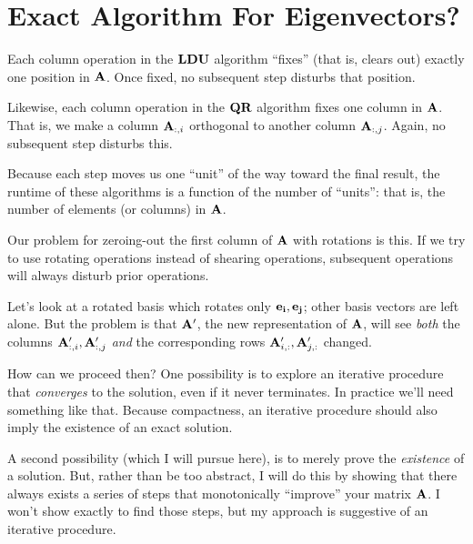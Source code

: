 \section{Exact Algorithm For Eigenvectors?}

Each column operation in the $\mathbf{L}\mathbf{D}\mathbf{U}$ algorithm ``fixes'' (that is,
clears out) exactly one position in $\mathbf{A}$. Once fixed, no subsequent
step disturbs that position.

Likewise, each column operation in the $\mathbf{Q}\mathbf{R}$ algorithm fixes one
column in $\mathbf{A}$. That is, we make a column $\mathbf{A}_{:, i}$ orthogonal
to another column $\mathbf{A}_{:, j}$. Again, no subsequent step disturbs
this.

Because each step moves us one ``unit'' of the way toward the final
result, the runtime of these algorithms is a function of the number of
``units'': that is, the number of elements (or columns) in $\mathbf{A}$.

Our problem for zeroing-out the first column of $\mathbf{A}$ with rotations
is this. If we try to use rotating operations instead of shearing
operations, subsequent operations will always disturb prior operations.

Let's look at a rotated basis which rotates only $\mathbf{e}_{\mathbf{i}}, \mathbf{e}_{\mathbf{j}}$;
other basis vectors are left alone. But the problem is that $\mathbf{A}'$,
the new representation of $\mathbf{A}$, will see
\emph{both} the columns $\mathbf{A}'_{:, i}, \mathbf{A}'_{:, j}$ \emph{and}
the corresponding rows $\mathbf{A}'_{i, :}, \mathbf{A}'_{j, :}$ changed.

How can we proceed then? One possibility is to explore an iterative
procedure that \emph{converges} to the solution, even if it never
terminates. In practice we'll need something like that. Because
compactness, an iterative procedure should also imply the existence of
an exact solution.

A second possibility (which I will pursue here), is to merely prove the
\emph{existence} of a solution. But, rather than be too abstract, I
will do this by showing that there always exists a series of steps that
monotonically ``improve'' your matrix $\mathbf{A}$. I won't show exactly to
find those steps, but my approach is suggestive of an iterative
procedure.
